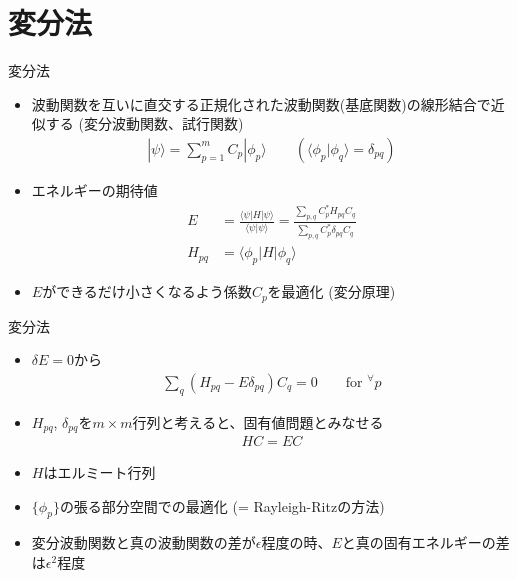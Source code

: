 \section{変分法}

\begin{frame}[t,fragile]{変分法}
  \begin{itemize}
  \item 波動関数を互いに直交する正規化された波動関数(基底関数)の線形結合で近似する (変分波動関数、試行関数)
    \begin{align*}
      | \psi \rangle = \sum_{p=1}^m C_p | \phi_p \rangle \qquad (\langle \phi_p | \phi_q \rangle = \delta_{pq})
    \end{align*}
  \item エネルギーの期待値
    \begin{align*}
      E &= \frac{\langle \psi | H | \psi \rangle}{\langle \psi | \psi \rangle} = \frac{\sum_{p,q} C_p^* H_{pq} C_q}{\sum_{p,q} C_p^* \delta_{pq} C_q} \\
      H_{pq} &= \langle \phi_p | H | \phi_q \rangle
    \end{align*}
  \item $E$ができるだけ小さくなるよう係数$C_p$を最適化 (変分原理)
  \end{itemize}
\end{frame}

\begin{frame}[t,fragile]{変分法}
  \begin{itemize}
  \item $\delta E = 0$から
    \begin{align*}
      \sum_{q} (H_{pq} - E \delta_{pq} ) C_q = 0 \qquad \text{for $^\forall p$}
    \end{align*}
  \item $H_{pq}$, $\delta_{pq}$を$m \times m$行列と考えると、固有値問題とみなせる
    \begin{align*}
      H C = E C
    \end{align*}
  \item $H$はエルミート行列
  \item $\{ \phi_p \}$の張る部分空間での最適化 (= Rayleigh-Ritzの方法)
  \item 変分波動関数と真の波動関数の差が$\epsilon$程度の時、$E$と真の固有エネルギーの差は$\epsilon^2$程度
  \end{itemize}
\end{frame}

